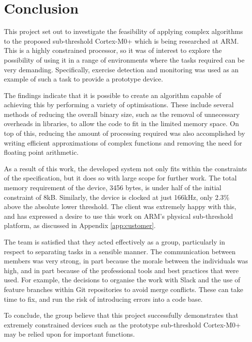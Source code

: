 \chapter{Conclusion}

This project set out to investigate the feasibility of applying complex algorithms to the proposed sub-threshold Cortex-M0+ which is being researched at ARM. This is a highly constrained processor, so it was of interest to explore the possibility of using it in a range of environments where the tasks required can be very demanding. Specifically, exercise detection and monitoring was used as an example of such a task to provide a prototype device.

The findings indicate that it is possible to create an algorithm capable of achieving this by performing a variety of optimisations. These include several methods of reducing the overall binary size, such as the removal of unnecessary overheads in libraries, to allow the code to fit in the limited memory space. On top of this, reducing the amount of processing required was also accomplished by writing efficient approximations of complex functions and removing the need for floating point arithmetic.

As a result of this work, the developed system not only fits within the constraints of the specification, but it does so with large scope for further work. The total memory requirement of the device, 3456 bytes, is under half of the initial constraint of 8kB. Similarly, the device is clocked at just 166kHz, only 2.3\% above the absolute lower threshold. The client was extremely happy with this, and has expressed a desire to use this work on ARM's physical sub-threshold platform, as discussed in Appendix \ref{app:customer}.

The team is satisfied that they acted effectively as a group, particularly in respect to separating tasks in a sensible manner. The communication between members was very strong, in part because the morale between the individuals was high, and in part because of the professional tools and best practices that were used. For example, the decisions to organise the work with Slack and the use of feature branches within Git repositories to avoid merge conflicts. These can take time to fix, and run the risk of introducing errors into a code base.

To conclude, the group believe that this project successfully demonstrates that extremely constrained devices such as the prototype sub-threshold Cortex-M0+ may be relied upon for important functions.
